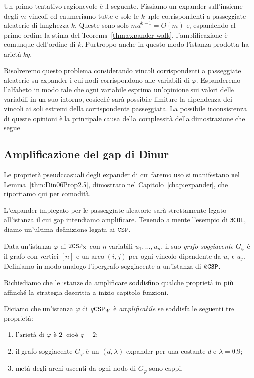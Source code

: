 Un primo tentativo ragionevole è il seguente. Fissiamo un expander
sull'insieme degli $m$ vincoli ed enumeriamo tutte e sole le $k$-uple
corrispondenti a passeggiate aleatorie di lunghezza $k$.
Queste sono solo $m d^{k - 1} = O(m)$ e, espandendo al primo ordine la stima
del Teorema~\ref{thm:expander-walk}, l'amplificazione è comunque dell'ordine
di $k$.
Purtroppo anche in questo modo l'istanza prodotta ha arietà $k q$.

Risolveremo questo problema considerando vincoli corrispondenti a passeggiate
aleatorie su expander i cui nodi corrispondono alle variabili di $\varphi$.
Espanderemo l'alfabeto in modo tale che ogni variabile esprima un'opinione sui
valori delle variabili in un suo intorno, cosicché sarà possibile limitare la
dipendenza dei vincoli ai soli estremi della corrispondente passeggiata.
La possibile inconsistenza di queste opinioni è la principale causa della
complessità della dimostrazione che segue.

\subsection{Amplificazione del gap di Dinur}

Le proprietà pseudocasuali degli expander di cui faremo uso si manifestano nel
Lemma~\ref{thm:Din06Prop2.5}, dimostrato nel Capitolo~\ref{chap:expander}, che
riportiamo qui per comodità.

\expanderFwalk*

L'expander impiegato per le passeggiate aleatorie sarà strettamente
legato all'istanza il cui gap intendiamo amplificare. Tenendo a mente l'esempio
di \texttt{3COL}, diamo un'ultima definizione legata ai $\mathtt{CSP}$.

\begin{definition}
	Data un'istanza $\varphi$ di $2\mathtt{CSP}_\Sigma$ con $n$ variabili
	$u_1, \dots, u_n$, il suo \emph{grafo soggiacente} $G_\varphi$ è il grafo
	con vertici $[n]$ e un arco $(i, j)$ per ogni vincolo dipendente da $u_i$ e
	$u_j$. Definiamo in modo analogo l'ipergrafo soggiacente a un'istanza di
	$k\mathtt{CSP}$.
\end{definition}

Richiediamo che le istanze da amplificare soddisfino qualche proprietà in più
affinché la strategia descritta a inizio capitolo funzioni.

\begin{definition} \label{def:istanza-amplificabile}
	Diciamo che un'istanza $\varphi$ di $q \mathtt{CSP}_W$ è \emph{amplificabile} se
	soddisfa le seguenti tre proprietà:
	\begin{enumerate}
		\item l'arietà di $\varphi$ è $2$, cioè $q = 2$;
		\item il grafo soggiacente $G_\varphi$ è un $(d, \lambda)$-expander per
			una costante $d$ e $\lambda = 0.9$;
		\item metà degli archi uscenti da ogni nodo di $G_\varphi$ sono cappi.
	\end{enumerate}
\end{definition}

